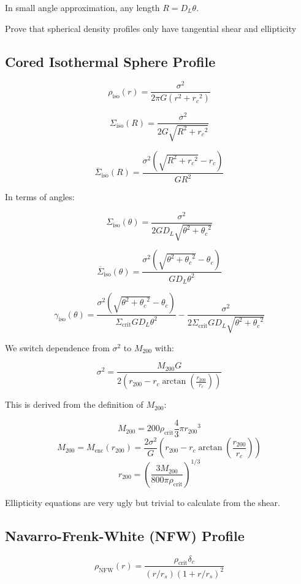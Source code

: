 \documentclass[10pt]{article}
\begin{document}
In small angle approximation, any length $R = D_L \theta$.

Prove that spherical density profiles only have tangential shear and ellipticity


\subsection{Cored Isothermal Sphere Profile}

\[\rho_\mathrm{iso}(r) = \frac{\sigma^2}{2\pi G (r^2 + {r_c}^2)}\]

\[\Sigma_\mathrm{iso}(R) = \frac{\sigma^2}{2 G \sqrt{R^2 + {r_c}^2}}\]

\[\overline{\Sigma}_\mathrm{iso}(R) = \frac{\sigma^2 \left(\sqrt{R^2 + {r_c}^2} - r_c \right)}{G R^2}\]

In terms of angles:

\[\Sigma_\mathrm{iso}(\theta) = \frac{\sigma^2}{2 G D_L \sqrt{\theta^2 + {\theta_c}^2}}\]

\[\overline{\Sigma}_\mathrm{iso}(\theta) = \frac{\sigma^2 \left(\sqrt{\theta^2 + {\theta_c}^2} - \theta_c \right)}{G D_L \theta^2}\]

\[\gamma_\mathrm{iso}(\theta) = \frac{\sigma^2 \left(\sqrt{\theta^2 + {\theta_c}^2} - \theta_c \right)}{\Sigma_\mathrm{crit} G D_L \theta^2} - \frac{\sigma^2}{2 \Sigma_\mathrm{crit} G D_L \sqrt{\theta^2 + {\theta_c}^2}}\]

We switch dependence from $\sigma^2$ to $M_{200}$ with:

\[\sigma^2 = \frac{M_{200} G}{2 \left( r_{200} - r_c \arctan{\left(\frac{r_{200}}{r_c}\right)} \right)}\]

This is derived from the definition of $M_{200}$:

\[M_{200} = 200 \rho_\mathrm{crit} \frac{4}{3} \pi {r_{200}}^3\]
\[M_{200} = M_\mathrm{enc}(r_{200}) = \frac{2 \sigma^2}{G} \left( r_{200} - r_c \arctan{\left(\frac{r_{200}}{r_c}\right)} \right)\]
\[r_{200} = \left( \frac{3 M_{200}}{800 \pi \rho_\mathrm{crit}} \right)^{1/3}\]

Ellipticity equations are very ugly but trivial to calculate from the shear.



\subsection{Navarro-Frenk-White (NFW) Profile}

\[\rho_\mathrm{NFW}(r) = \frac{\rho_\mathrm{crit} \delta_c}{(r/r_s)\left(1 + r/r_s\right)^2}\]
\end{document}
